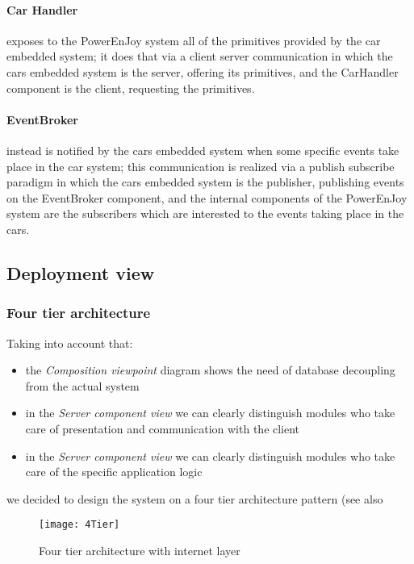\paragraph{Car Handler} exposes to the PowerEnJoy system all of the primitives provided by the car embedded system; it does that via a client server communication in which the cars embedded system is the server, offering its primitives, and the CarHandler component is the client, requesting the primitives.
\paragraph{EventBroker} instead is notified by the cars embedded system when some specific events take place in the car system; this communication is realized via a publish subscribe paradigm in which the cars embedded system is the publisher, publishing events on the EventBroker component, and the internal components of the PowerEnJoy system are the subscribers which are interested to the events taking place in the cars. 
\clearpage

\subsection{Deployment view}

\subsubsection{Four tier architecture}
Taking into account that:
\begin{itemize}
	\item the \emph{Composition viewpoint} diagram shows the need of database decoupling from the actual system
	\item in the \emph{Server component view} we can clearly distinguish modules who take care of presentation and communication with the client
	\item in the \emph{Server component view} we can clearly distinguish modules who take care of the specific application logic
\end{itemize}
we decided to design the system on a four tier architecture pattern (see also \label{sec:deploymentView}
\begin{figure}[h!]
	\centering
	\texttt{[image: 4Tier]}
	\caption{
		\label{fig:fourTierCloud} 
		Four tier architecture with internet layer
	}
\end{figure}
